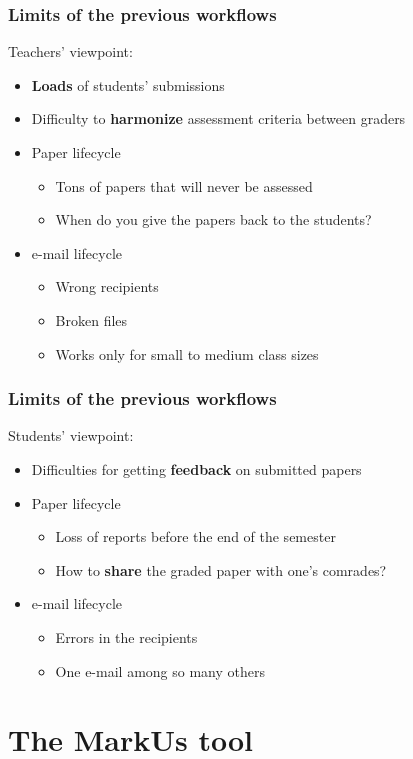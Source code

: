 \documentclass[hyperref,french,usenames,xcolor=dvipsnames]{beamer}
\begin{document}
\frame
{
  \frametitle{Limits of the previous workflows}

\begin{alertblock}{Teachers' viewpoint:}
\begin{itemize}
\item \textbf{Loads} of students' submissions
\item Difficulty to \textbf{harmonize} assessment criteria between graders 
\item Paper lifecycle 
\begin{itemize}
\item Tons of papers that will never be assessed
\item When do you give the papers back to the students? 
\end{itemize}
\item e-mail lifecycle
\begin{itemize}
\item Wrong recipients
\item Broken files
\item Works only for small to medium class sizes
\end{itemize}
\end{itemize}
\end{alertblock}
}

\frame
{
  \frametitle{Limits of the previous workflows}

\begin{alertblock}{Students' viewpoint:}
\begin{itemize}
\item Difficulties for getting \textbf{feedback} on submitted papers
\item Paper lifecycle 
\begin{itemize}
\item Loss of reports before the end of the semester
\item How to \textbf{share} the graded paper with one's comrades? 
\end{itemize}
\item e-mail lifecycle
\begin{itemize}
\item Errors in the recipients 
\item One e-mail among so many others
\end{itemize}
\end{itemize}
\end{alertblock}
}

\section*{The MarkUs tool}
\end{document}
